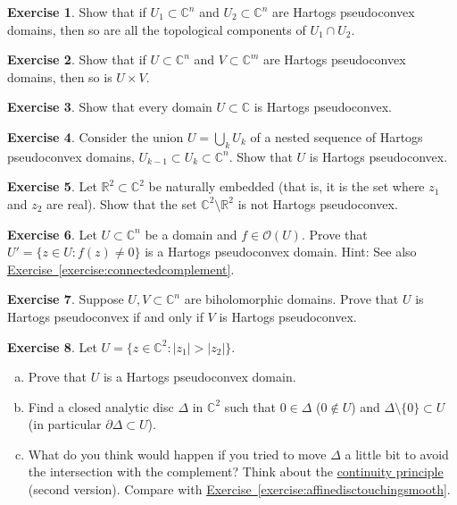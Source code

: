 \documentclass[12pt,openany]{book}
\newcommand{\sabs}[1]{\lvert {#1} \rvert}
\newcommand{\C}{{\mathbb{C}}}
\newcommand{\R}{{\mathbb{R}}}
\newcommand{\sO}{{\mathscr{O}}}
\theoremstyle{plain}
\theoremstyle{remark}
\theoremstyle{definition}
\newenvironment{exbox}{%
    \def\FrameCommand{\vrule width 1pt \relax\hspace{10pt}}%
    \MakeFramed{\advance\hsize-\width\FrameRestore}%
}{%
    \endMakeFramed
}
\newenvironment{exparts}{%
    \leavevmode\begin{enumerate}[a),noitemsep,topsep=0pt,parsep=0pt,partopsep=0pt]
}{%
    \end{enumerate}
}
\theoremstyle{exercise}
\newtheorem{exercise}{Exercise}[section]
\theoremstyle{example}
\newcommand{\exerciseref}[1]{\hyperref[#1]{Exercise~\ref*{#1}}}
\begin{document}
\begin{exbox}
\begin{exercise} \label{exercise:intersectionhpseudo}
Show that if $U_1 \subset \C^n$ and $U_2 \subset \C^n$ are Hartogs
pseudoconvex domains, then so are all the topological components of $U_1 \cap U_2$.
\end{exercise}

\begin{exercise}
Show that if $U \subset \C^n$ and $V \subset \C^m$ are Hartogs
pseudoconvex domains, then so is $U \times V$.
\end{exercise}

\begin{exercise}
Show that every domain $U \subset \C$ is Hartogs pseudoconvex.
\end{exercise}

\begin{exercise} \label{exercise:nestedunions}
Consider the union $U = \bigcup_k U_k$ of a nested sequence of Hartogs pseudoconvex
domains, $U_{k-1} \subset U_k \subset \C^n$.  Show that $U$ is Hartogs pseudoconvex.
\end{exercise}

\begin{exercise}
Let $\R^2 \subset \C^2$ be naturally embedded (that is, it is the
set where $z_1$ and $z_2$ are real).  Show that the set $\C^2 \setminus
\R^2$ is not Hartogs pseudoconvex.
\end{exercise}

\begin{exercise}
Let $U \subset \C^n$ be a domain and $f \in \sO(U)$.  Prove that
$U' = \bigl\{ z \in U : f(z) \neq 0 \bigr\}$ is a Hartogs pseudoconvex
domain.  Hint: See also \exerciseref{exercise:connectedcomplement}.
\end{exercise}

\begin{exercise} \label{exercise:biholHartogs}
Suppose $U,V \subset \C^n$ are biholomorphic domains.
Prove that $U$ is Hartogs pseudoconvex if and only if $V$ is
Hartogs pseudoconvex.
\end{exercise}

\begin{exercise}
Let $U = \bigl\{ z \in \C^2 : \sabs{z_1} > \sabs{z_2} \bigr\}$.
\begin{exparts}
\item
Prove that $U$ is a Hartogs pseudoconvex domain.
\item
Find a closed analytic disc $\Delta$ in $\C^2$ such that $0 \in \Delta$
($0 \notin U$)
and $\Delta \setminus \{ 0 \} \subset U$ (in particular $\partial \Delta
\subset U$).
\item
What do you think would happen if you tried to move $\Delta$ a
little bit to avoid the intersection with the complement?
Think about the \hyperref[thm:contprinciple2]{continuity principle}
(second version).
Compare with \exerciseref{exercise:affinedisctouchingsmooth}.
\end{exparts}
\end{exercise}


\end{exbox}
\end{document}
